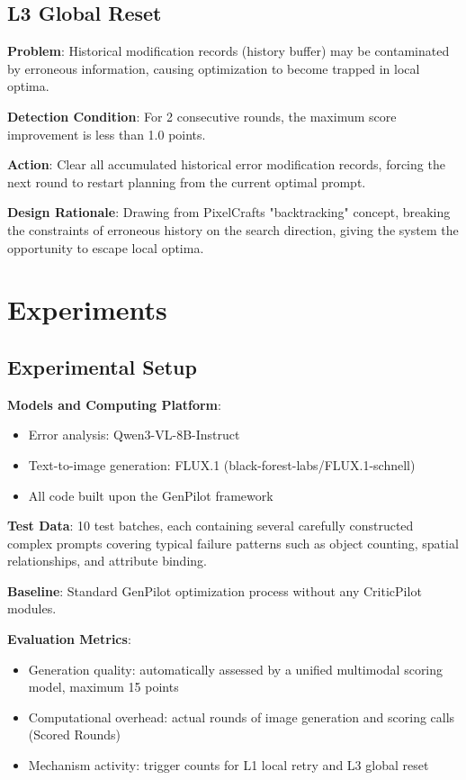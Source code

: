 \documentclass[UTF8]{article} %
\begin{document}
\subsection{L3 Global Reset}\label{l3-global-reset}

\textbf{Problem}: Historical modification records (history buffer) may
be contaminated by erroneous information, causing optimization to become
trapped in local optima.

\textbf{Detection Condition}: For 2 consecutive rounds, the maximum
score improvement is less than 1.0 points.

\textbf{Action}: Clear all accumulated historical error modification
records, forcing the next round to restart planning from the current
optimal prompt.

\textbf{Design Rationale}: Drawing from PixelCraft\textquotesingle s
"backtracking" concept, breaking the constraints of erroneous history on
the search direction, giving the system the opportunity to escape local
optima.

\section{Experiments}\label{experiments}

\subsection{Experimental Setup}\label{experimental-setup}

\textbf{Models and Computing Platform}:

\begin{itemize}
\item
  Error analysis: Qwen3-VL-8B-Instruct
\item
  Text-to-image generation: FLUX.1 (black-forest-labs/FLUX.1-schnell)
\item
  All code built upon the GenPilot framework
\end{itemize}

\textbf{Test Data}: 10 test batches, each containing several carefully
constructed complex prompts covering typical failure patterns such as
object counting, spatial relationships, and attribute binding.

\textbf{Baseline}: Standard GenPilot optimization process without any
CriticPilot modules.

\textbf{Evaluation Metrics}:

\begin{itemize}
\item
  Generation quality: automatically assessed by a unified multimodal
  scoring model, maximum 15 points
\item
  Computational overhead: actual rounds of image generation and scoring
  calls (Scored Rounds)
\item
  Mechanism activity: trigger counts for L1 local retry and L3 global
  reset
\end{itemize}
\end{document}
